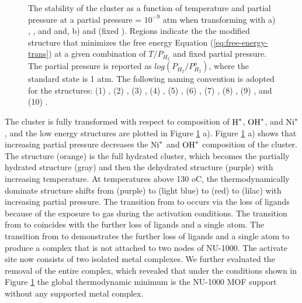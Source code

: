 \documentclass[journal=jctcce,manuscript=article]{achemso}
\begin{document}
\begin{figure}[H]
{    The stability of the  cluster as a function of temperature and  partial pressure at a  partial pressure = $10^{-9}$ atm when transforming with a)
    , , and  and, b)  and  (fixed ). Regions indicate the the modified structure that minimizes the free energy Equation (\ref{eq:free-energy-trans}) at a given combination of $T/P_{H_{2}}$ and fixed  partial pressure. The  partial pressure is reported as $log(P_{H_{2}}/P_{H_{2}}^{o})$, where the standard state is 1 atm. The following naming convention is adopted for the structures: 
    (1) ,                %
    (2) ,      %
    (3) ,     %
    (4) ,                %
    (5) ,                %
    (6) ,                  %
    (7) ,      %
    (8) ,           %
    (9)  , and    %
    (10) . %
    }
    \label{fig:phase_diagram_Ni_combined}
\end{figure}   

The cluster is fully transformed with respect to composition of $\ce{H^{*}}$, $\ce{OH^{*}}$, and $\ce{Ni^{*}}$, and the low energy structures are plotted in Figure \ref{fig:phase_diagram_Ni_combined} a). Figure \ref{fig:phase_diagram_Ni_combined} a) shows that increasing  partial pressure decreases the $\ce{Ni^{*}}$ and $\ce{OH^{*}}$  composition of the cluster. The  structure (orange) is the full hydrated  cluster, which becomes the partially hydrated  structure (gray) and then the dehydrated  structure (purple) with increasing temperature. At temperatures above 130 oC, the thermodynamically dominate structure shifts from  (purple) to  (light blue) to  (red) to  (lilac) with increasing  partial pressure. The transition from  to  occurs via the loss of  ligands because of the exposure to  gas during the activation conditions. The transition from  to  coincides with the further loss of  ligands and a single  atom. The transition from  to  demonstrates the further loss of  ligands and a single  atom to produce a complex that is not attached to two nodes of NU-1000. The activate site now consists of two isolated  metal complexes. We further evaluated the removal of the entire complex, which revealed that under the conditions shown in Figure \ref{fig:phase_diagram_Ni_combined} the global thermodynamic minimum is the NU-1000 MOF support without any  supported metal complex.
\end{document}
